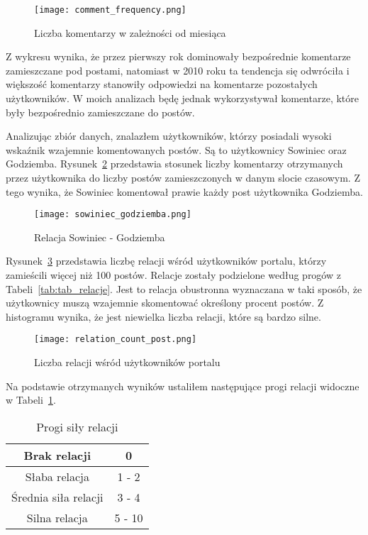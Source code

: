 \documentclass[polish,12pt]{aghthesis}
\begin{document}
\begin{figure}[ht]
    \centering
    \texttt{[image: comment\_frequency.png]}
    \caption{Liczba komentarzy w zależności od miesiąca}
    \label{fig:comments_count}
\end{figure}

\FloatBarrier

Z wykresu wynika, że przez pierwszy rok dominowały bezpośrednie komentarze zamieszczane pod postami, natomiast w 2010 roku ta tendencja się odwróciła i większość komentarzy stanowiły odpowiedzi na komentarze pozostałych użytkowników. W moich analizach będę jednak wykorzystywał komentarze, które były bezpośrednio zamieszczane do postów.

Analizując zbiór danych, znalazłem użytkowników, którzy posiadali wysoki wskaźnik wzajemnie komentowanych postów. Są to użytkownicy Sowiniec oraz Godziemba. Rysunek~\ref{fig:sowiniecgodz} przedstawia stosunek liczby komentarzy otrzymanych przez użytkownika do liczby postów zamieszczonych w danym slocie czasowym. Z tego wynika, że Sowiniec komentował prawie każdy post użytkownika Godziemba. 

\begin{figure}[ht]
    \centering
    \texttt{[image: sowiniec\_godziemba.png]}
    \caption{Relacja Sowiniec - Godziemba}
    \label{fig:sowiniecgodz}
\end{figure}

\FloatBarrier

Rysunek~\ref{fig:relcount} przedstawia liczbę relacji wśród użytkowników portalu, którzy zamieścili więcej niż 100 postów. Relacje zostały podzielone według progów z Tabeli~\ref{tab:tab_relacje}. Jest to relacja obustronna wyznaczana w taki sposób, że użytkownicy muszą wzajemnie skomentować określony procent postów. Z histogramu wynika, że jest niewielka liczba relacji, które są bardzo silne.

\begin{figure}[ht]
    \centering
    \texttt{[image: relation\_count\_post.png]}
    \caption{Liczba relacji wśród użytkowników portalu}
    \label{fig:relcount}
\end{figure}

\FloatBarrier


Na podstawie otrzymanych wyników ustaliłem następujące progi relacji widoczne w Tabeli~\ref{tab:rel_progi}.

\begin{table}[h]
\centering
\begin{tabular}{|c|c|}
\hline
Brak relacji & 0  \\
\hline
Słaba relacja & 1 - 2 \\
\hline
Średnia siła relacji & 3 - 4 \\
\hline
Silna relacja & 5 - 10 \\
\hline
\end{tabular}
\caption[Progi siły relacji]{Progi siły relacji}
\label{tab:rel_progi}
\end{table}
\end{document}
